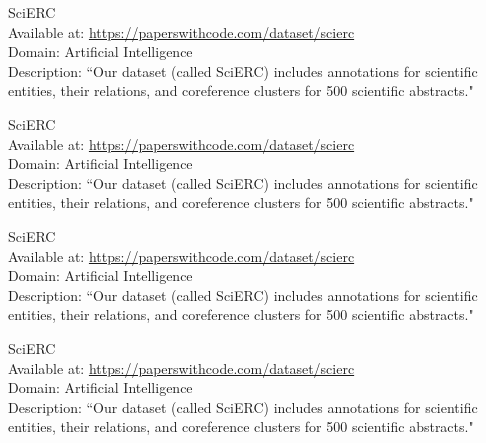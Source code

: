 \begin{dataset}
SciERC~\cite{DBLP:conf/emnlp/LuanHOH18}\\
Available at: \url{https://paperswithcode.com/dataset/scierc}\\
Domain: Artificial Intelligence\\
Description: ``Our dataset (called SciERC) includes annotations for scientific entities, their relations, and coreference clusters for 500 scientific abstracts."~\cite{DBLP:conf/emnlp/LuanHOH18}
\label{dataset:scierc3}
\end{dataset}
\begin{dataset}
SciERC~\cite{DBLP:conf/emnlp/LuanHOH18}\\
Available at: \url{https://paperswithcode.com/dataset/scierc}\\
Domain: Artificial Intelligence\\
Description: ``Our dataset (called SciERC) includes annotations for scientific entities, their relations, and coreference clusters for 500 scientific abstracts."~\cite{DBLP:conf/emnlp/LuanHOH18}
\label{dataset:scierc4}
\end{dataset}
\begin{dataset}
SciERC~\cite{DBLP:conf/emnlp/LuanHOH18}\\
Available at: \url{https://paperswithcode.com/dataset/scierc}\\
Domain: Artificial Intelligence\\
Description: ``Our dataset (called SciERC) includes annotations for scientific entities, their relations, and coreference clusters for 500 scientific abstracts."~\cite{DBLP:conf/emnlp/LuanHOH18}
\label{dataset:scierc5}
\end{dataset}
\begin{dataset}
SciERC~\cite{DBLP:conf/emnlp/LuanHOH18}\\
Available at: \url{https://paperswithcode.com/dataset/scierc}\\
Domain: Artificial Intelligence\\
Description: ``Our dataset (called SciERC) includes annotations for scientific entities, their relations, and coreference clusters for 500 scientific abstracts."~\cite{DBLP:conf/emnlp/LuanHOH18}
\label{dataset:scierc6}
\end{dataset}
